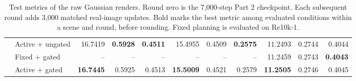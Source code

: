{\begin{table}[!t]
\begin{tabular}{llrrrrrrrrr}
      & Active + ungated & 16.7419 & \textbf{0.5928} & \textbf{0.4511} & 15.4955 & 0.4509 & \textbf{0.2575} & 11.2493 & 0.2744 & 0.4044 \\
      & Fixed + gated & -- & -- & -- & -- & -- & -- & 11.2459 & 0.2743 & \textbf{0.4043} \\
      & Active + gated & \textbf{16.7445} & 0.5925 & 0.4513 & \textbf{15.5009} & 0.4521 & 0.2579 & \textbf{11.2505} & 0.2746 & 0.4045 \\
    \bottomrule
  \end{tabular}
  \caption{Test metrics of the raw Gaussian renders. Round zero is the 7,000-step Part 2 checkpoint. Each subsequent round adds 3,000 matched real-image updates. Bold marks the best metric among evaluated conditions within a scene and round, before rounding. Fixed planning is evaluated on Re10k-1.}
  \label{tab:part3_main}
\end{table}
}

